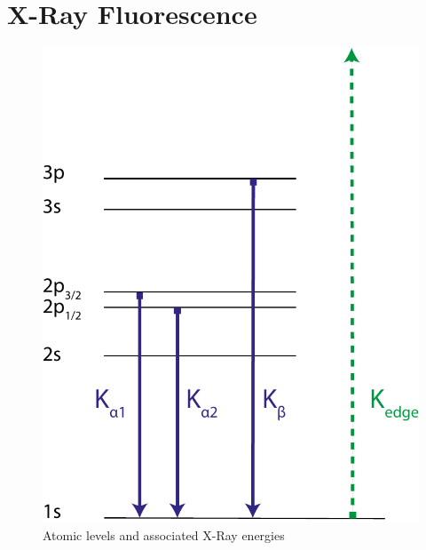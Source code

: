 \section{X-Ray Fluorescence}
 \begin{figure}
	\centering
	\includegraphics[width=0.4\linewidth]{images/levels.pdf}
	\caption[Atomic Levels]{Atomic levels and associated X-Ray energies}
	\label{fig:levels}
\end{figure}


